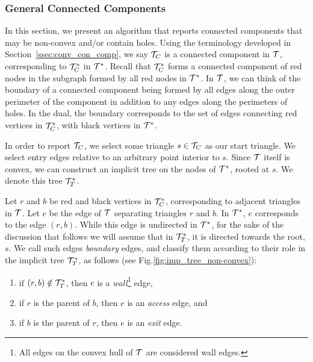   \subsubsection{General Connected Components}\label{ssec:gen_con_comp}

  In this section, we present an algorithm that reports connected components 
  that may be non-convex and/or contain holes.
  Using the terminology developed in Section~\ref{ssec:conv_con_comp}, we 
  say ${\mathcal{T}}_C$ is a connected component in $\mathcal{T}$, corresponding 
  to ${\mathcal{T}}_C^*$ in $\mathcal{T}^*$. 
  Recall that ${\mathcal{T}}_C^*$ forms a connected component of red nodes 
  in the subgraph formed by all red nodes in $\mathcal{T}^*$.
  In $\mathcal{T}$, we can think of the boundary of a connected component being 
  formed by all edges along the outer perimeter of the component
  in addition to any edges along the perimeters of holes. 
  In the dual, the boundary corresponds to the set of edges connecting 
  red vertices in ${\mathcal{T}}_C^*$, with black vertices in $\mathcal{T}^*$. 

  In order to report ${\mathcal{T}}_C$, we select some triangle $s \in {\mathcal{T}}_C$ as our
  start triangle. 
  We select entry edges relative to an arbitrary point interior to $s$.
  Since $\mathcal{T}$ itself is convex, we can construct an implicit tree
  on the nodes of $\mathcal{T}^*$, rooted at $s$.
  We denote this tree $\mathcal{T}^*_T$.
  
  Let $r$ and $b$ be red and black vertices in
  ${\mathcal{T}}_C^*$, corresponding to adjacent triangles in $\mathcal{T}$.
  Let $e$ be the edge of $\mathcal{T}$ separating triangles $r$ and $b$.
  In $\mathcal{T}^*$, $e$ corresponds to the edge $(r,b)$.
  While this edge is undirected in $\mathcal{T}^*$, for the sake of the
  discussion that follows we will assume that in $\mathcal{T}^*_T$, it
  is directed towards the root, $s$.
  We call such edges \emph{boundary} edges, and classify them according
  to their role in the implicit tree $\mathcal{T}^*_T$, as follows 
  (see Fig.\ref{fig:imp_tree_non-convex}):
  
  \begin{enumerate}
    \item if $(r,b) \notin \mathcal{T}^*_T$, then $e$ is a \emph{wall}\footnote{
    All edges on the convex hull of $\mathcal{T}$ are considered wall edges.} edge, 
    \item if $r$ is the parent of $b$, then $e$ is an \emph{access} edge, and 
    \item if $b$ is the parent of $r$, then $e$ is an \emph{exit} edge.
  \end{enumerate}

